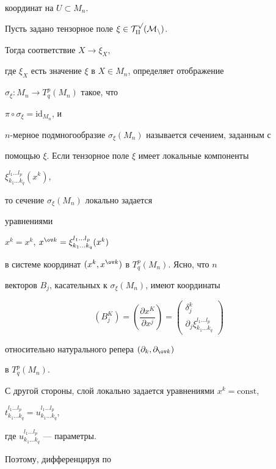 координат на $U \subset M_n$.





Пусть задано тензорное поле $\xi \in \cal T^p_q(M_n)$.


Тогда соответствие $X \to \xi_X$,


где $\xi_X$ есть значение $\xi$ в $X \in M_n$, определяет отображение 


$\sigma_\xi : M_n \to T^p_q(M_n)$ такое, что


$\pi \circ \sigma_\xi = \text{id}_{M_n}$, и 


$n$-мерное подмногообразие $\sigma_\xi(M_n)$ называется сечением, заданным с 


помощью $\xi$. Если тензорное поле $\xi$ имеет локальные компоненты 


$\xi_{k_1 \dotsc k_q}^{l_1 \dotsc l_p}(x^k)$,


то сечение $\sigma_\xi(M_n)$ локально задается 


уравнениями


$x^k = x^k$, $x^{\ov k} = \xi_{k_1 \dotsc k_q}^{l_1 \dotsc l_p}(x^k)$ 


в системе координат $(x^k, x^{\ov k})$ в $T^p_q(M_n)$. Ясно, что $n$ 


векторов $B_j$, касательных к $\sigma_\xi(M_n)$, имеют координаты


$$


(B^K_j) = \left( \frac{\partial x^K}{\partial x^j} \right) = 


\left( 


\begin{array}{l} \delta^k_j \\


\partial_j \xi_{k_1 \dotsc k_q}^{l_1 \dotsc l_p}\end{array}\right) 


$$


относительно натурального репера $(\partial_k, \partial_{\ov k})$


в $T^p_q(M_n)$.





С другой стороны, слой локально задается уравнениями $x^k=\text{const}$,


$t_{k_1\dotsc k_q}^{l_1\dotsc l_p}=u_{k_1 \dotsc k_q}^{l_1 \dotsc l_p}$,


где $u_{k_1 \dotsc k_q}^{l_1 \dotsc l_p}$ --- параметры.


Поэтому, дифференцируя по 



